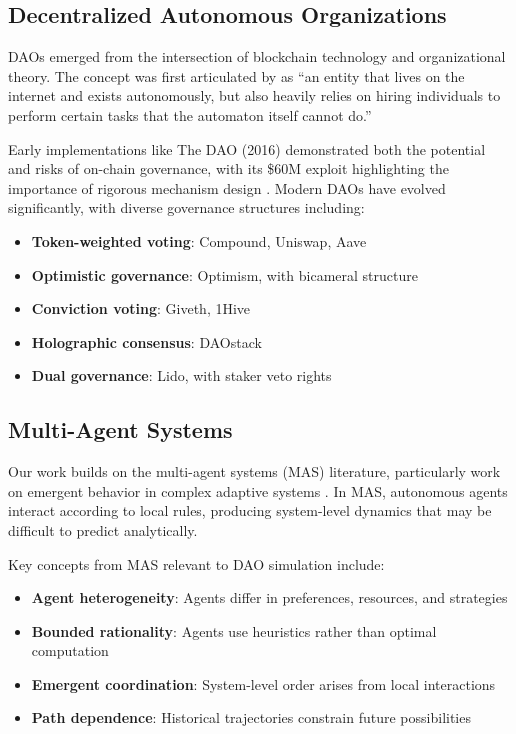 
\subsection{Decentralized Autonomous Organizations}

DAOs emerged from the intersection of blockchain technology and organizational theory. The concept was first articulated by \citet{buterin2014dao} as ``an entity that lives on the internet and exists autonomously, but also heavily relies on hiring individuals to perform certain tasks that the automaton itself cannot do.''

Early implementations like The DAO (2016) demonstrated both the potential and risks of on-chain governance, with its \$60M exploit highlighting the importance of rigorous mechanism design \citep{dhillon2017dao}. Modern DAOs have evolved significantly, with diverse governance structures including:

\begin{itemize}
    \item \textbf{Token-weighted voting}: Compound, Uniswap, Aave
    \item \textbf{Optimistic governance}: Optimism, with bicameral structure
    \item \textbf{Conviction voting}: Giveth, 1Hive
    \item \textbf{Holographic consensus}: DAOstack
    \item \textbf{Dual governance}: Lido, with staker veto rights
\end{itemize}

\subsection{Multi-Agent Systems}

Our work builds on the multi-agent systems (MAS) literature, particularly work on emergent behavior in complex adaptive systems \citep{wooldridge2009introduction}. In MAS, autonomous agents interact according to local rules, producing system-level dynamics that may be difficult to predict analytically.

Key concepts from MAS relevant to DAO simulation include:
\begin{itemize}
    \item \textbf{Agent heterogeneity}: Agents differ in preferences, resources, and strategies
    \item \textbf{Bounded rationality}: Agents use heuristics rather than optimal computation
    \item \textbf{Emergent coordination}: System-level order arises from local interactions
    \item \textbf{Path dependence}: Historical trajectories constrain future possibilities
\end{itemize}

